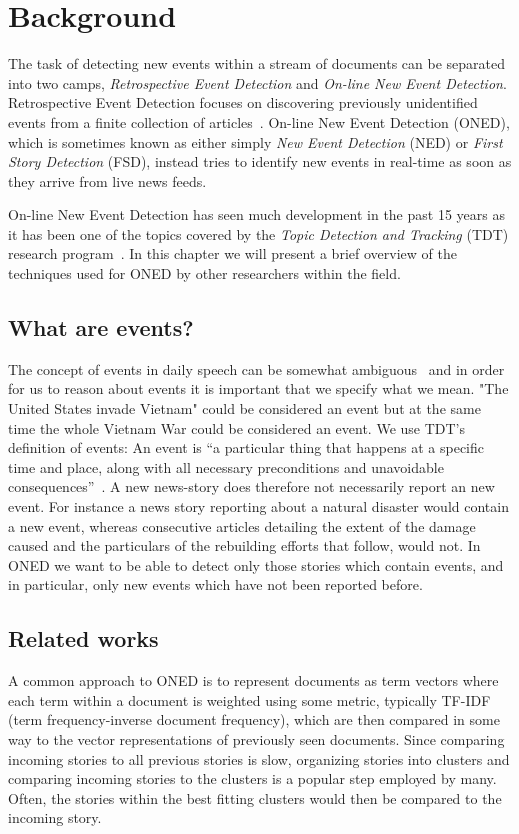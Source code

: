 \chapter{Background}
\label{chapter:background}

The task of detecting new events within a stream of documents can be separated into two camps, \emph{Retrospective Event Detection} and \emph{On-line New Event Detection}. Retrospective Event Detection focuses on discovering previously unidentified events from a finite collection of articles~\cite{yang1998study}. On-line New Event Detection (ONED), which is sometimes known as either simply \emph{New Event Detection} (NED) or \emph{First Story Detection} (FSD), instead tries to identify new events in real-time as soon as they arrive from live news feeds.

On-line New Event Detection has seen much development in the past 15 years as it has been one of the topics covered by the \emph{Topic Detection and Tracking} (TDT) research program~\cite{tdt2004annotation}. In this chapter we will present a brief overview of the techniques used for ONED by other researchers within the field.

\section{What are events?}
The concept of events in daily speech can be somewhat ambiguous~\cite{papka1999online} and in order for us to reason about events it is important that we specify what we mean. "The United States invade Vietnam" could be considered an event but at the same time the whole Vietnam War could be considered an event. We use TDT's definition of events: An event is ``a particular thing that happens at a specific time and place, along with all necessary preconditions and unavoidable consequences''~\cite{tdt2004annotation}. 
A new news-story does therefore not necessarily report an new event. For instance a news story reporting about a natural disaster would contain a new event, whereas consecutive articles detailing the extent of the damage caused and the particulars of the rebuilding efforts that follow, would not. In ONED we want to be able to detect only those stories which contain events, and in particular, only new events which have not been reported before.

\section{Related works}
A common approach to ONED is to represent documents as term vectors where each term within a document is weighted using some metric, typically TF-IDF (term frequency-inverse document frequency), which are then compared in some way to the vector representations of previously seen documents. Since comparing incoming stories to all previous stories is slow, organizing stories into clusters and comparing incoming stories to the clusters is a popular step employed by many. Often, the stories within the best fitting clusters would then be compared to the incoming story.

